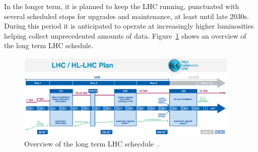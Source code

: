 In the longer term, it is planned to keep the LHC running, punctuated with several scheduled stops for upgrades and maintenance, at least until late 2030s. During this period it is anticipated to operate at increasingly higher luminosities helping collect unprecedented amounts of data. Figure~\ref{fig:lhc_schedule} shows an overview of the long term LHC schedule. 
\begin{figure}
\begin{center}
  \includegraphics[width=0.95\textwidth,keepaspectratio]{plots_and_figures/chapter3/lhc_schedule.png}
\caption{Overview of the long term LHC schecdule~\cite{LHC_plan_ref}.}
\label{fig:lhc_schedule}
\end{center}
\end{figure}



